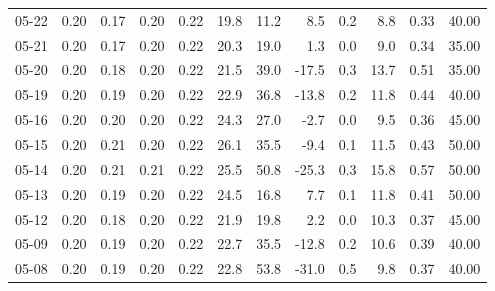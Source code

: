 \begin{threeparttable}
{\begin{tabular}{lrrrrrrrrrrr}
  05-22 &          0.20 &          0.17 &          0.20 &        0.22 &                19.8 &                11.2 &        8.5 &                 0.2 &              8.8 &            0.33 &                  40.00 \\
  05-21 &          0.20 &          0.17 &          0.20 &        0.22 &                20.3 &                19.0 &        1.3 &                 0.0 &              9.0 &            0.34 &                  35.00 \\
  05-20 &          0.20 &          0.18 &          0.20 &        0.22 &                21.5 &                39.0 &      -17.5 &                 0.3 &             13.7 &            0.51 &                  35.00 \\
  05-19 &          0.20 &          0.19 &          0.20 &        0.22 &                22.9 &                36.8 &      -13.8 &                 0.2 &             11.8 &            0.44 &                  40.00 \\
  05-16 &          0.20 &          0.20 &          0.20 &        0.22 &                24.3 &                27.0 &       -2.7 &                 0.0 &              9.5 &            0.36 &                  45.00 \\
  05-15 &          0.20 &          0.21 &          0.20 &        0.22 &                26.1 &                35.5 &       -9.4 &                 0.1 &             11.5 &            0.43 &                  50.00 \\
  05-14 &          0.20 &          0.21 &          0.21 &        0.22 &                25.5 &                50.8 &      -25.3 &                 0.3 &             15.8 &            0.57 &                  50.00 \\
  05-13 &          0.20 &          0.19 &          0.20 &        0.22 &                24.5 &                16.8 &        7.7 &                 0.1 &             11.8 &            0.41 &                  50.00 \\
  05-12 &          0.20 &          0.18 &          0.20 &        0.22 &                21.9 &                19.8 &        2.2 &                 0.0 &             10.3 &            0.37 &                  45.00 \\
  05-09 &          0.20 &          0.19 &          0.20 &        0.22 &                22.7 &                35.5 &      -12.8 &                 0.2 &             10.6 &            0.39 &                  40.00 \\
  05-08 &          0.20 &          0.19 &          0.20 &        0.22 &                22.8 &                53.8 &      -31.0 &                 0.5 &              9.8 &            0.37 &                  40.00 \\

\end{tabular}}
\end{threeparttable}
